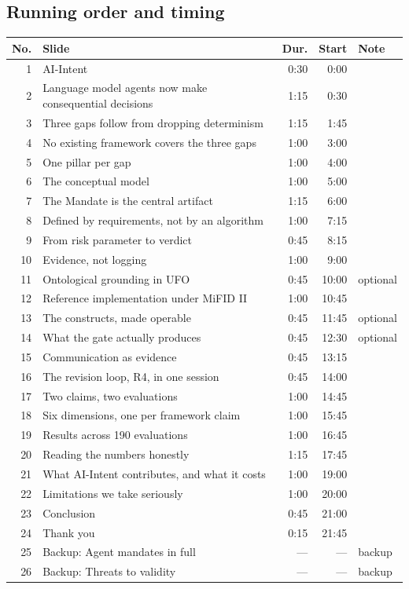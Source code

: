 \documentclass[17pt,a4paper]{extarticle}
\begin{document}
\subsection*{\color{uds}Running order and timing}
{\small
\begin{longtable}{@{}r p{8.6cm} r r l@{}}
\toprule
\textbf{No.} & \textbf{Slide} & \textbf{Dur.} & \textbf{Start} & \textbf{Note} \\
\midrule
\endhead
1 & AI-Intent & 0:30 & 0:00 &  \\
2 & Language model agents now make consequential decisions & 1:15 & 0:30 &  \\
3 & Three gaps follow from dropping determinism & 1:15 & 1:45 &  \\
4 & No existing framework covers the three gaps & 1:00 & 3:00 &  \\
5 & One pillar per gap & 1:00 & 4:00 &  \\
6 & The conceptual model & 1:00 & 5:00 &  \\
7 & The Mandate is the central artifact & 1:15 & 6:00 &  \\
8 & Defined by requirements, not by an algorithm & 1:00 & 7:15 &  \\
9 & From risk parameter to verdict & 0:45 & 8:15 &  \\
10 & Evidence, not logging & 1:00 & 9:00 &  \\
11 & Ontological grounding in UFO & 0:45 & 10:00 & optional \\
12 & Reference implementation under MiFID II & 1:00 & 10:45 &  \\
13 & The constructs, made operable & 0:45 & 11:45 & optional \\
14 & What the gate actually produces & 0:45 & 12:30 & optional \\
15 & Communication as evidence & 0:45 & 13:15 &  \\
16 & The revision loop, R4, in one session & 0:45 & 14:00 &  \\
17 & Two claims, two evaluations & 1:00 & 14:45 &  \\
18 & Six dimensions, one per framework claim & 1:00 & 15:45 &  \\
19 & Results across 190 evaluations & 1:00 & 16:45 &  \\
20 & Reading the numbers honestly & 1:15 & 17:45 &  \\
21 & What AI-Intent contributes, and what it costs & 1:00 & 19:00 &  \\
22 & Limitations we take seriously & 1:00 & 20:00 &  \\
23 & Conclusion & 0:45 & 21:00 &  \\
24 & Thank you & 0:15 & 21:45 &  \\
25 & Backup: Agent mandates in full & --- & --- & backup \\
26 & Backup: Threats to validity & --- & --- & backup \\
\bottomrule
\end{longtable}
}
\end{document}
